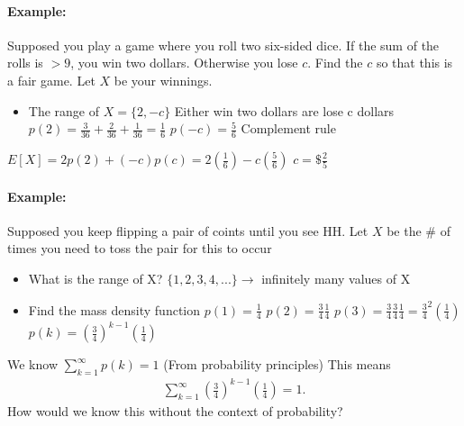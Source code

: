 \documentclass[11pt]{article}
\begin{document}
    \paragraph[Example]{Example: } Supposed you play a game where you roll two six-sided dice.
    If the sum of the rolls is $> 9$, you win two dollars.
    Otherwise you lose $c$.
    Find the $c$ so that this is a fair game.
    Let $X$ be your winnings.
    \begin{itemize}
        \item The range of $X = \{2, -c\}$ Either win two dollars are lose c dollars
        \subitem $p(2) = \frac{3}{36} + \frac{2}{36} + \frac{1}{36} = \frac{1}{6}$
        \subitem $p(-c) = \frac{5}{6}$ Complement rule
    \end{itemize}
    $E[X] = 2p(2) + (-c)p(c) = 2(\frac{1}{6}) - c(\frac{5}{6})$
    $c = \$\frac{2}{5}$
    \paragraph[Example]{Example: } Supposed you keep flipping a pair of coints until you see HH.
    Let $X$ be the \# of times you need to toss the pair for this to occur
    \begin{itemize}
        \item What is the range of X?
        \subitem $\{1,2,3,4, ...\} \to$ infinitely many values of X
        \item Find the mass density function
        \subitem $p(1) = \frac{1}{4}$
        \subitem $p(2) = \frac{3}{4} \frac{1}{4}$
        \subitem $p(3) = \frac{3}{4} \frac{3}{4} \frac{1}{4} = \frac{3}{4}^2(\frac{1}{4})$
        \subitem $p(k) = (\frac{3}{4})^{k-1}(\frac{1}{4})$
    \end{itemize}
    We know
    $ \sum_{k=1}^{\infty} p(k) =1$ (From probability principles)
    This means
    \begin{align*}
        \sum_{k=1}^{\infty} (\frac{3}{4})^{k-1}(\frac{1}{4}) = 1.
    \end{align*}
    How would we know this without the context of probability?
\end{document}
